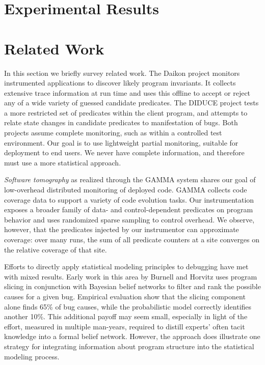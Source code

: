 \documentclass{sig-alternate}
\newcommand{\termdef}[1]{\textit{#1}}
\begin{document}
\section{Experimental Results}
\label{sec:experiments:results}



\section{Related Work}
\label{sec:related-work}

In this section we briefly survey related work.
The Daikon project \cite{ernst2001} monitors instrumented applications
to discover likely program invariants.  It collects extensive trace
information at run time and uses this offline to accept or reject any
of a wide variety of guessed candidate predicates.  The DIDUCE project
\cite{ICSE02*291} tests a more restricted set of predicates within the
client program, and attempts to relate state changes in candidate
predicates to manifestation of bugs.  Both projects assume complete
monitoring, such as within a controlled test environment.  Our goal is
to use lightweight partial monitoring, suitable for deployment to end
users.  We never have complete information, and therefore must use a
more statistical approach.

\termdef{Software tomography} as realized through the GAMMA system
\cite{PASTE'02*2,Orso:2003:LFDIART} shares our goal of low-overhead
distributed monitoring of deployed code.  GAMMA collects code coverage
data to support a variety of code evolution tasks.  Our
instrumentation exposes a broader family of data- and
control-dependent predicates on program behavior and uses randomized
sparse sampling to control overhead.  We observe, however, that the
predicates injected by our instrumentor can approximate coverage: over
many runs, the sum of all predicate counters at a site converges on
the relative coverage of that site.

Efforts to directly apply statistical modeling principles to debugging
have met with mixed results.  Early work in this area by Burnell and
Horvitz \cite{Burnell:1995:SCM} uses program slicing in conjunction
with Bayesian belief networks to filter and rank the possible causes
for a given bug.  Empirical evaluation show that the slicing component
alone finds 65\% of bug causes, while the probabilistic model
correctly identifies another 10\%.  This additional payoff may seem
small, especially in light of the effort, measured in multiple
man-years, required to distill experts' often tacit knowledge into a
formal belief network.  However, the approach does illustrate one
strategy for integrating information about program structure into the
statistical modeling process.
\end{document}
